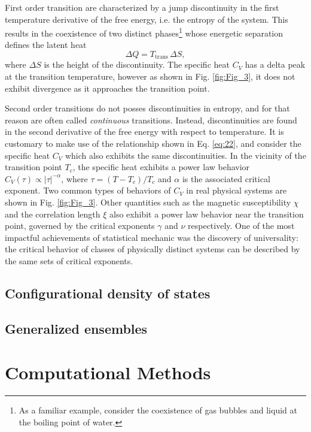 \documentclass[12pt]{report}
\begin{document}
First order transition are characterized by a jump discontinuity in the first temperature derivative of the free energy, i.e. the entropy of the system. This results in the coexistence of two distinct phases\footnote{As a familiar example, consider the coexistence of gas bubbles and liquid at the boiling point of water.} whose energetic separation defines the latent heat
\begin{equation}
\Delta Q = T_{\mathrm{trans}}\,\Delta S,
\end{equation}
where $\Delta S$ is the height of the discontinuity. The specific heat $C_{V}$ has a delta peak at the transition temperature, however as shown in Fig. \ref{fig:Fig_3}, it does not exhibit divergence as it approaches the transition point.

Second order transitions do not posses discontinuities in entropy, and for that reason are often called \textit{continuous} transitions. Instead, discontinuities are found in the second derivative of the free energy with respect to temperature. It is customary to make use of the relationship shown in Eq. \ref{eq:22}, and consider the specific heat $C_{V}$ which also exhibits the same discontinuities.
In the vicinity of the transition point $T_{c}$, the specific heat exhibits a power law behavior $C_{V}(\tau) \propto \left| \tau \right|^{-\alpha}$, where $\tau = \left(T-T_{c}\right)/T_{c}$ and $\alpha$ is the associated critical exponent. Two common types of behaviors of $C_{V}$ in real physical systems are shown in Fig. \ref{fig:Fig_3}. Other quantities such as the magnetic susceptibility $\chi$ and the correlation length $\xi$ also exhibit a power law behavior near the transition point, governed by the critical exponents $\gamma$ and $\nu$ respectively. One of the most impactful achievements of statistical mechanic was the discovery of universality: the critical behavior of classes of physically distinct systems can be described by the same sets of critical exponents. 

\section{Configurational density of states}
\section{Generalized ensembles}

\chapter{Computational Methods}
\end{document}
